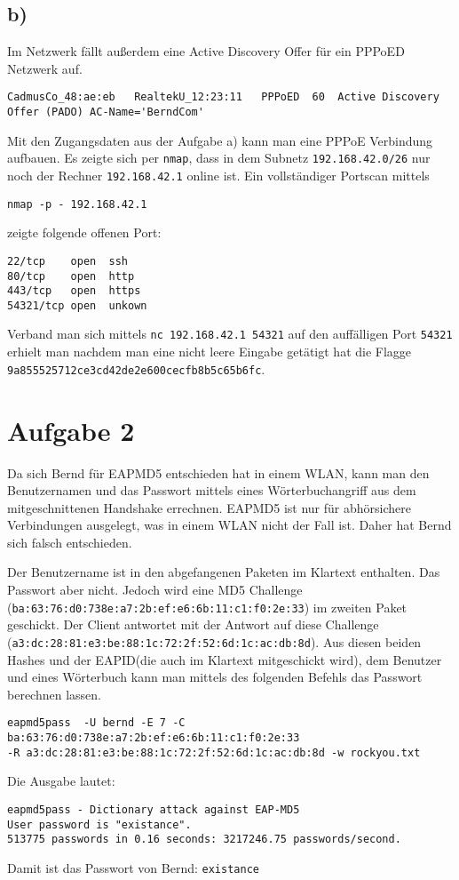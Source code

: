 \documentclass[10pt,a4paper]{article}
\begin{document}
\subsection*{b)}
Im Netzwerk fällt außerdem eine Active Discovery Offer für ein PPPoED Netzwerk auf.
\begin{verbatim}
CadmusCo_48:ae:eb	RealtekU_12:23:11	PPPoED	60	Active Discovery Offer (PADO) AC-Name='BerndCom'
\end{verbatim}
Mit den Zugangsdaten aus der Aufgabe a) kann man eine PPPoE Verbindung aufbauen. 
Es zeigte sich per \texttt{nmap}, dass in dem Subnetz \texttt{192.168.42.0/26} nur noch der Rechner \texttt{192.168.42.1} online ist. Ein vollständiger Portscan mittels
\begin{verbatim}
nmap -p - 192.168.42.1
\end{verbatim} 
zeigte folgende offenen Port:
\begin{verbatim}
22/tcp    open  ssh
80/tcp    open  http
443/tcp   open  https
54321/tcp open  unkown 
\end{verbatim}
Verband man sich mittels \texttt{nc 192.168.42.1 54321} auf den auffälligen Port \texttt{54321} erhielt man nachdem man eine nicht leere Eingabe getätigt hat die Flagge \texttt{9a855525712ce3cd42de2e600cecfb8b5c65b6fc}.

\section*{Aufgabe 2}
Da sich Bernd für EAPMD5 entschieden hat in einem WLAN, kann man den Benutzernamen und das Passwort mittels eines Wörterbuchangriff aus dem mitgeschnittenen Handshake errechnen. EAPMD5 ist nur für abhörsichere Verbindungen ausgelegt, was in einem WLAN  nicht der Fall ist. Daher hat Bernd sich falsch entschieden. 

Der Benutzername ist in den abgefangenen Paketen im Klartext enthalten. Das Passwort aber nicht. Jedoch wird eine MD5 Challenge (\texttt{ba:63:76:d0:738e:a7:2b:ef:e6:6b:11:c1:f0:2e:33}) im zweiten Paket geschickt. Der Client antwortet mit der Antwort auf diese Challenge (\texttt{a3:dc:28:81:e3:be:88:1c:72:2f:52:6d:1c:ac:db:8d}). Aus diesen beiden Hashes und der EAPID(die auch im Klartext mitgeschickt wird), dem Benutzer und eines Wörterbuch kann man mittels des folgenden Befehls das Passwort berechnen lassen.
\begin{verbatim}
eapmd5pass  -U bernd -E 7 -C ba:63:76:d0:738e:a7:2b:ef:e6:6b:11:c1:f0:2e:33 
-R a3:dc:28:81:e3:be:88:1c:72:2f:52:6d:1c:ac:db:8d -w rockyou.txt
\end{verbatim}
Die Ausgabe lautet:
\begin{verbatim}
eapmd5pass - Dictionary attack against EAP-MD5
User password is "existance".
513775 passwords in 0.16 seconds: 3217246.75 passwords/second.
\end{verbatim}

Damit ist das Passwort von Bernd: \texttt{existance}
\end{document}
